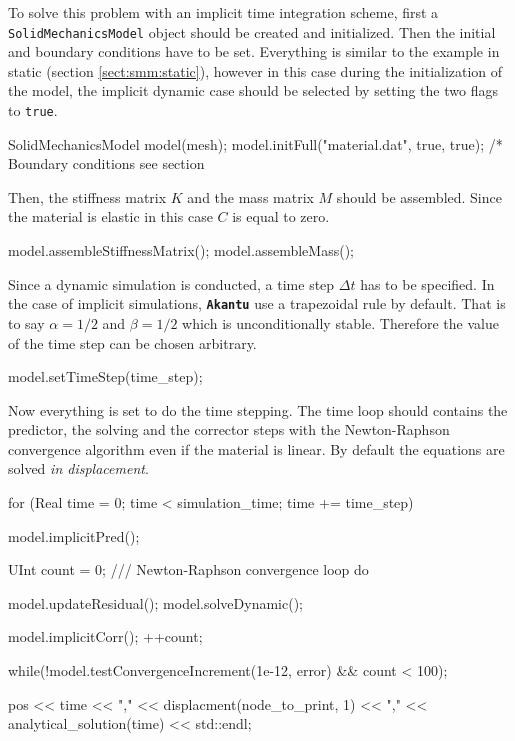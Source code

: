 \documentclass[a4paper,11pt]{book}
\newcommand{\akantu}{\texttt{\textbf{Akantu}}\xspace}
\newcommand{\code}[1]{\texttt{#1}}
\begin{document}
To  solve  this  problem with  an  implicit  time  integration scheme,  first  a
\code{SolidMechanicsModel} object  should be created and  initialized.  Then the
initial and  boundary conditions have to  be set.  Everything is  similar to the
example in  static (section \ref{sect:smm:static}), however in  this case during
the initialization of the model, the implicit dynamic case should be selected by
setting the two flags to \code{true}.

\begin{cpp}[escapechar=\%]
  SolidMechanicsModel model(mesh);
  model.initFull("material.dat", true, true);
  /* Boundary conditions see section %
\end{cpp}

Then,   the  stiffness  matrix   $K$  and   the  mass   matrix  $M$   should  be
assembled.  Since the material is elastic in this case $C$ is equal to zero.
\begin{cpp}
 model.assembleStiffnessMatrix();
 model.assembleMass();
\end{cpp}

Since  a dynamic  simulation is  conducted, a  time step  $\Delta t$  has  to be
specified. In the  case of implicit simulations, \akantu  use a trapezoidal rule
by  default.  That  is to  say  $\alpha  =  1/2$  and  $\beta =  1/2$  which  is
unconditionally  stable. Therefore  the value  of the  time step  can  be chosen
arbitrary.  
\begin{cpp}
  model.setTimeStep(time_step);
\end{cpp}

Now everything is set to do the time stepping. The time loop should contains the
predictor,  the  solving  and   the  corrector  steps  with  the  Newton-Raphson
convergence algorithm even  if the material is linear.  By default the equations
are  solved  \emph{in  displacement}.   
\begin{cpp}
  for (Real time = 0; time < simulation_time; time += time_step) {
   model.implicitPred();

   UInt count = 0;
   /// Newton-Raphson convergence loop
   do {
     model.updateResidual();
     model.solveDynamic();

     model.implicitCorr();
     ++count;
   } while(!model.testConvergenceIncrement(1e-12, error) && count < 100);

   pos << time
       << "," << displacment(node_to_print, 1)
       << "," << analytical_solution(time) << std::endl;
 }
\end{cpp}
\end{document}
